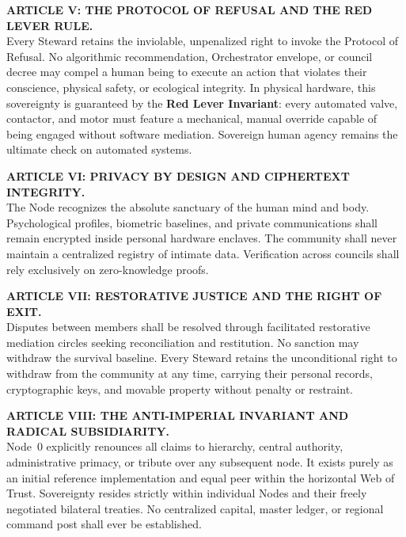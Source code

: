 \vspace{0.5em}
\noindent\textbf{ARTICLE V: THE PROTOCOL OF REFUSAL AND THE RED LEVER RULE.} \\
Every Steward retains the inviolable, unpenalized right to invoke the Protocol of Refusal. No algorithmic recommendation, Orchestrator envelope, or council decree may compel a human being to execute an action that violates their conscience, physical safety, or ecological integrity. In physical hardware, this sovereignty is guaranteed by the \textbf{Red Lever Invariant}: every automated valve, contactor, and motor must feature a mechanical, manual override capable of being engaged without software mediation. Sovereign human agency remains the ultimate check on automated systems.

\vspace{0.5em}
\noindent\textbf{ARTICLE VI: PRIVACY BY DESIGN AND CIPHERTEXT INTEGRITY.} \\
The Node recognizes the absolute sanctuary of the human mind and body. Psychological profiles, biometric baselines, and private communications shall remain encrypted inside personal hardware enclaves. The community shall never maintain a centralized registry of intimate data. Verification across councils shall rely exclusively on zero-knowledge proofs.

\vspace{0.5em}
\noindent\textbf{ARTICLE VII: RESTORATIVE JUSTICE AND THE RIGHT OF EXIT.} \\
Disputes between members shall be resolved through facilitated restorative mediation circles seeking reconciliation and restitution. No sanction may withdraw the survival baseline. Every Steward retains the unconditional right to withdraw from the community at any time, carrying their personal records, cryptographic keys, and movable property without penalty or restraint.

\vspace{0.5em}
\noindent\textbf{ARTICLE VIII: THE ANTI-IMPERIAL INVARIANT AND RADICAL SUBSIDIARITY.} \\
Node~0 explicitly renounces all claims to hierarchy, central authority, administrative primacy, or tribute over any subsequent node. It exists purely as an initial reference implementation and equal peer within the horizontal Web of Trust. Sovereignty resides strictly within individual Nodes and their freely negotiated bilateral treaties. No centralized capital, master ledger, or regional command post shall ever be established.

